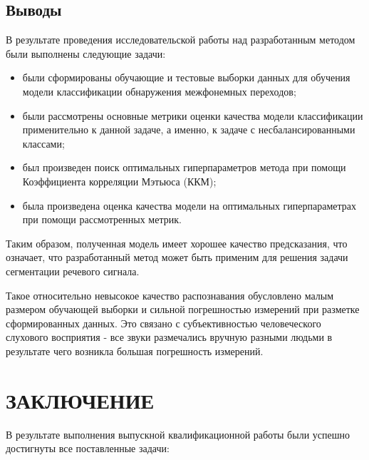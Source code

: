 \documentclass[utf8x, 14pt, oneside, a4paper]{article}
\begin{document}
	\subsection{Выводы}
	
	В результате проведения исследовательской работы над разработанным методом были выполнены следующие задачи:
	
	\begin{itemize}
		\item были сформированы обучающие и тестовые выборки данных для обучения модели классификации обнаружения межфонемных переходов;
		\item были рассмотрены основные метрики оценки качества модели классификации применительно к данной задаче, а именно, к задаче с несбалансированными классами;
		\item был произведен поиск оптимальных гиперпараметров метода при помощи Коэффициента корреляции Мэтьюса (ККМ);
		\item была произведена оценка качества модели на оптимальных гиперпараметрах при помощи рассмотренных метрик.
	\end{itemize}

	Таким образом, полученная модель имеет хорошее качество предсказания, что означает, что разработанный метод может быть применим для решения задачи сегментации речевого сигнала.
	
	Такое относительно невысокое качество распознавания обусловлено малым размером обучающей выборки и сильной погрешностью измерений при разметке сформированных данных. Это связано с субъективностью человеческого слухового восприятия - все звуки размечались вручную разными людьми в результате чего возникла большая погрешность измерений.
	
	\pagebreak
	
	\section*{ЗАКЛЮЧЕНИЕ}
	
	В результате выполнения выпускной квалификационной работы были \linebreak успешно достигнуты все поставленные задачи:
	
\end{document}
